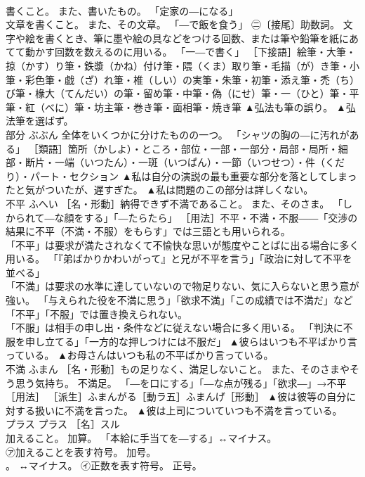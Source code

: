 \documentclass[8pt]{extreport}
\begin{document}
\begin{CJK}{UTF8}{min}
\\	書くこと。 また、書いたもの。 「定家の―になる」 
\\	文章を書くこと。 また、その文章。 「―で飯を食う」 ㊁〔接尾〕助数詞。 文字や絵を書くとき、筆に墨や絵の具などをつける回数、または筆や鉛筆を紙にあてて動かす回数を数えるのに用いる。 「一―で書く」 ［下接語］絵筆・大筆・掠（かす）り筆・鉄漿（かね）付け筆・隈（くま）取り筆・毛描（が）き筆・小筆・彩色筆・戯（ざ）れ筆・椎（しい）の実筆・朱筆・初筆・添え筆・禿（ち）び筆・椽大（てんだい）の筆・留め筆・中筆・偽（にせ）筆・一（ひと）筆・平筆・紅（べに）筆・坊主筆・巻き筆・面相筆・焼き筆	▲弘法も筆の誤り。 ▲弘法筆を選ばず。
\\	部分	ぶぶん	全体をいくつかに分けたものの一つ。 「シャツの胸の―に汚れがある」 ［類語］箇所（かしよ）・ところ・部位・一部・一部分・局部・局所・細部・断片・一端（いつたん）・一斑（いつぱん）・一節（いつせつ）・件（くだり）・パート・セクション	▲私は自分の演説の最も重要な部分を落としてしまったと気がついたが、遅すぎた。 ▲私は問題のこの部分は詳しくない。
\\	不平	ふへい	［名・形動］納得できず不満であること。 また、そのさま。 「しかられて―な顔をする」「―たらたら」 ［用法］不平・不満・不服――「交渉の結果に不平（不満・不服）をもらす」では三語とも用いられる。 
\\	「不平」は要求が満たされなくて不愉快な思いが態度やことばに出る場合に多く用いる。 「『弟ばかりかわいがって』と兄が不平を言う」「政治に対して不平を並べる」
\\	「不満」は要求の水準に達していないので物足りない、気に入らないと思う意が強い。 「与えられた役を不満に思う」「欲求不満」「この成績では不満だ」など「不平」「不服」では置き換えられない。 
\\	「不服」は相手の申し出・条件などに従えない場合に多く用いる。 「判決に不服を申し立てる」「一方的な押しつけには不服だ」	▲彼らはいつも不平ばかり言っている。 ▲お母さんはいつも私の不平ばかり言っている。
\\	不満	ふまん	［名・形動］もの足りなく、満足しないこと。 また、そのさまやそう思う気持ち。 不満足。 「―を口にする」「―な点が残る」「欲求―」→不平［用法］ ［派生］ふまんがる［動ラ五］ふまんげ［形動］	▲彼は彼等の自分に対する扱いに不満を言った。 ▲彼は上司についていつも不満を言っている。
\\	プラス	プラス	［名］スル 
\\	加えること。 加算。 「本給に手当てを―する」↔マイナス。 
\\	㋐加えることを表す符号。 加号。 
\\	。 ↔マイナス。 ㋑正数を表す符号。 正号。 

\end{CJK}
\end{document}
